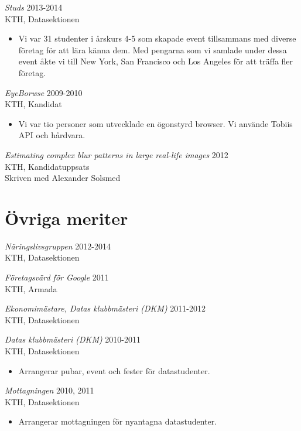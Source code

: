 \documentclass[margin, 10pt]{res} %
\begin{document}
\begin{resume}
{\sl Studs} \hfill 2013-2014 \\
KTH, Datasektionen
\begin{itemize} 
\item Vi var 31 studenter i årskurs 4-5 som skapade event tillsammans med diverse företag för att lära känna dem. Med pengarna som vi samlade under dessa event åkte vi till New York, San Francisco och Los Angeles för att träffa fler företag.
\end{itemize} 

\begin{minipage}{\textwidth}
{\sl EyeBorwse} \hfill 2009-2010 \\
KTH, Kandidat
\begin{itemize} 
\item Vi var tio personer som utvecklade en ögonstyrd browser. Vi använde Tobiis API och hårdvara.
\end{itemize} 
\end{minipage}

{\sl Estimating complex blur patterns in large real-life images} \hfill 2012 \\
KTH, Kandidatuppsats \\
Skriven med Alexander Solsmed



\section{Övriga meriter}

{\sl Näringslivsgruppen} \hfill 2012-2014 \\
KTH, Datasektionen


{\sl Företagsvärd för Google} \hfill 2011 \\
KTH, Armada

{\sl Ekonomimästare, Datas klubbmästeri (DKM)} \hfill 2011-2012 \\
KTH, Datasektionen

{\sl Datas klubbmästeri (DKM)} \hfill 2010-2011 \\
KTH, Datasektionen
\begin{itemize} 
\item Arrangerar pubar, event och fester för datastudenter.
\end{itemize} 

{\sl Mottagningen} \hfill 2010, 2011 \\
KTH, Datasektionen
\begin{itemize} 
\item Arrangerar mottagningen för nyantagna datastudenter.
\end{itemize} 


\end{resume}
\end{document}
